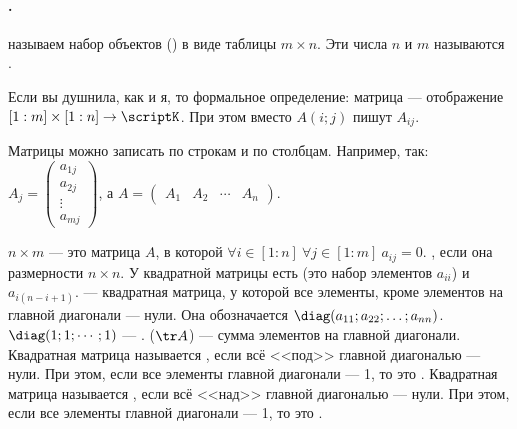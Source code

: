 \documentclass{article}
\begin{document}
    \paragraph{.}
    \begin{itemize}
        \dfn {} называем набор объектов () в виде таблицы $m\times n$. Эти числа $n$ и $m$ называются .
        \begin{Comment}
            Если вы душнила, как и я, то формальное определение: матрица --- отображение $[1:m]\times[1:n]\to\scriptK$. При этом вместо $A(i;j)$ пишут $A_{ij}$.
        \end{Comment}
        \begin{Comment}
            Матрицы можно записать по строкам и по столбцам. Например, так: 
            $A_j=\left(\begin{matrix}
                a_{1j}\\
                a_{2j}\\
                \vdots\\
                a_{mj}
            \end{matrix}\right)$, а $A=\left(\begin{matrix}
                A_1 & A_2 & \cdots & A_n
            \end{matrix}\right)$.
        \end{Comment}
        \dfn {} $n\times m$ --- это матрица $A$, в которой $\forall i\in[1:n]~\forall j\in[1:m]~a_{ij}=0$.
        \dfn {}, если она размерности $n\times n$.
        \dfn У квадратной матрицы есть  (это набор элементов $a_{ii}$) и  $a_{i(n-i+1)}$.
        \dfn {} --- квадратная матрица, у которой все элементы, кроме элементов на главной диагонали --- нули. Она обозначается $\diag(a_{11};a_{22};\ldots;a_{nn})$.
        \dfn $\diag(1;1;\cdots;1)$ --- .
        \dfn {} ($\tr A$) --- сумма элементов на главной диагонали.
        \dfn Квадратная матрица называется , если всё <<под>> главной диагональю --- нули. При этом, если все элементы главной диагонали --- 1, то это .
        \dfn Квадратная матрица называется , если всё <<над>> главной диагональю --- нули. При этом, если все элементы главной диагонали --- 1, то это .
    \end{itemize}
\end{document}
